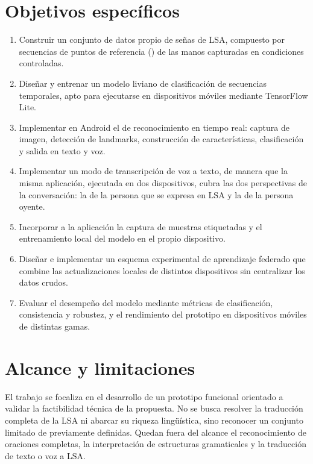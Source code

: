 \section{Objetivos específicos}

\begin{enumerate}
    \item Construir un conjunto de datos propio de señas de LSA, compuesto por secuencias de puntos de referencia () de las manos capturadas en condiciones controladas.
    \item Diseñar y entrenar un modelo liviano de clasificación de secuencias temporales, apto para ejecutarse en dispositivos móviles mediante TensorFlow Lite.
    \item Implementar en Android el  de reconocimiento en tiempo real: captura de imagen, detección de landmarks, construcción de características, clasificación y salida en texto y voz.
    \item Implementar un modo de transcripción de voz a texto, de manera que la misma aplicación, ejecutada en dos dispositivos, cubra las dos perspectivas de la conversación: la de la persona que se expresa en LSA y la de la persona oyente.
    \item Incorporar a la aplicación la captura de muestras etiquetadas y el entrenamiento local del modelo en el propio dispositivo.
    \item Diseñar e implementar un esquema experimental de aprendizaje federado que combine las actualizaciones locales de distintos dispositivos sin centralizar los datos crudos.
    \item Evaluar el desempeño del modelo mediante métricas de clasificación, consistencia y robustez, y el rendimiento del prototipo en dispositivos móviles de distintas gamas.
\end{enumerate}

\section{Alcance y limitaciones}

El trabajo se focaliza en el desarrollo de un prototipo funcional orientado a validar la factibilidad técnica de la propuesta. No se busca resolver la traducción completa de la LSA ni abarcar su riqueza lingüística, sino reconocer un conjunto limitado de  previamente definidas. Quedan fuera del alcance el reconocimiento de oraciones completas, la interpretación de estructuras gramaticales y la traducción de texto o voz a LSA.

